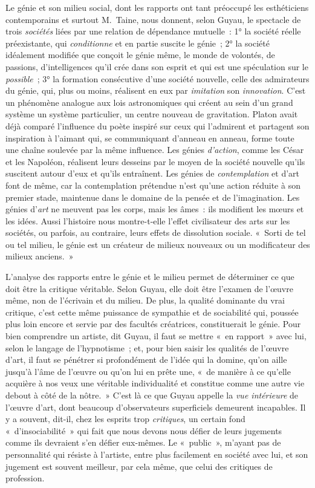 \documentclass[french,twoside]{book} %
\begin{document}
Le génie et son milieu social, dont les rapports ont tant préoccupé les esthéticiens contemporains et surtout M. Taine, nous donnent, selon Guyau, le spectacle de trois \emph{sociétés} liées par une relation de dépendance mutuelle : 1° la société réelle préexistante, qui \emph{conditionne} et en partie suscite le génie ; 2° la société idéalement modifiée que conçoit le génie même, le monde de volontés, de passions, d’intelligences qu’il crée dans son esprit et qui est une spéculation sur le \emph{possible} ; 3° la formation consécutive d’une société nouvelle, celle des admirateurs du génie, qui, plus ou moins, réalisent en eux par \emph{imitation} son \emph{innovation}. C’est un phénomène analogue aux lois astronomiques qui créent au sein d’un grand système un système particulier, un centre nouveau de gravitation. Platon avait déjà comparé l’influence du poète inspiré sur ceux qui l’admirent et partagent son inspiration à l’aimant qui, se communiquant d’anneau en anneau, forme toute une chaîne soulevée par la même influence. Les génies \emph{d’action}, comme les César et les Napoléon, réalisent leurs desseins par le moyen de la société nouvelle qu’ils suscitent autour d’eux et qu’ils entraînent. Les génies de \emph{contemplation} et d’art font de même, car la contemplation prétendue n’est qu’une action réduite à son premier stade, maintenue dans le domaine de la pensée et de l’imagination. Les génies d’\emph{art} ne meuvent pas les corps, mais les âmes : ils modifient les mœurs et les idées. Aussi l’histoire nous montre-t-elle l’effet civilisateur des arts sur les sociétés, ou parfois, au contraire, leurs effets de dissolution sociale. « Sorti de tel ou tel milieu, le génie est un créateur de milieux nouveaux ou un modificateur des milieux anciens. »\par
L’analyse des rapports entre le génie et le milieu permet de déterminer ce que doit être la critique véritable. Selon Guyau, elle doit être l’examen de l’œuvre même, non de l’écrivain et du milieu. De plus, la qualité dominante du vrai critique, c’est cette même puissance de sympathie et de sociabilité qui, poussée plus loin encore et servie par des facultés créatrices, constituerait le génie. Pour bien comprendre un artiste, dit Guyau, il faut se mettre « en rapport » avec lui, selon le langage de l’hypnotisme ; et, pour bien saisir les qualités de l’œuvre d’art, il faut se pénétrer si profondément de l’idée qui la domine, qu’on aille jusqu’à l’âme de l’œuvre ou qu’on lui en prête une, « de manière à ce qu’elle acquière à nos veux une véritable individualité et constitue comme une autre vie debout à côté de la nôtre. » C’est là ce que Guyau appelle la \emph{vue intérieure} de l’œuvre d’art, dont beaucoup d’observateurs superficiels demeurent incapables. Il y a souvent, dit-il, chez les esprits trop \emph{critiques}, un certain fond « d’insociabilité » qui fait que nous devons nous défier de leurs jugements comme ils devraient s’en défier eux-mêmes. Le « public », m’ayant pas de personnalité qui résiste à l’artiste, entre plus facilement en société avec lui, et son jugement est souvent meilleur, par cela même, que celui des critiques de profession.\par
\end{document}
